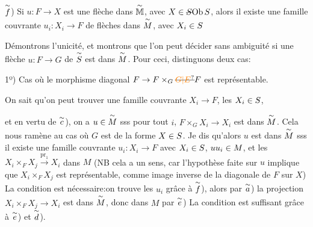 $\overset{\sim}{f}$) Si $u:F\to X$ est une flèche dans $\overset{\sim}{\mathbb{M}}$, avec $X\handwritten{\in}\deleted{S}\handwritten{\mathrm{Ob}\,S}$, alors il existe une famille couvrante $u_i:X_i\to F$ de flèches dans $\overset{\sim}{M}$, avec $X_i\in S$ 

Démontrons l'unicité, et montrons que l'on peut décider sans ambiguité si une flèche $u:F\to G$ de $\overset{\sim}{S}$ est dans $\overset{\sim}{M}$. Pour ceci, distinguons deux cas:

1º) Cas où le morphisme diagonal $F\to F\times_G\deleted{\unsure{G|E}}F$ est représentable. 

On sait qu'on peut trouver une famille couvrante $X_i\to F$, les $X_i\in S$,



et en vertu de $\overset{\sim}{c}$), on a $u\in \overset{\sim}{M}$ sss pour tout $i$, $F\times_G X_i\to X_i$ est dans $\overset{\sim}{M}$. Cela nous ramène au cas où $G$ est de la forme $X\in S$. Je dis qu'alors $u$ est dans $\overset{\sim}{M}$ sss il existe une famille couvrante $u_i:X_i\to F$ avec  $X_i\in S$, $uu_i\in M$,  et les $X_i\times_F X_j\xrightarrow{\mathrm{pr}_1}X_i$ dans $M$ (NB cela a un sens, car l'hypothèse faite sur $u$ implique que $X_i\times_F X_j$ est représentable, comme image inverse  de la diagonale de $F$ sur $X$) La condition est nécessaire:\deleted{\unsure{=|:}}on trouve les $u_i$ grâce à $\overset{\sim}{f}$), alors par $\overset{\sim}{a}$) la projection $X_i\times_F X_j\to X_i$ est dans $\overset{\sim}{M}$, donc dans $M$ par $\overset{\sim}{e}$) La condition est suffisant grâce à $\overset{\sim}{e}$) et $\overset{\sim}{d}$).

